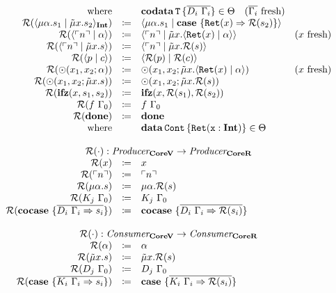 \[\begin{array}{rcll}
    \text{where} &  & \codata{T}{\overline{D_i\ \Gamma_i}} \in \Theta \quad \fresh{\overline{\Gamma_i}} & \\
    \redundancy{\cut{\mu\alpha.s_1}{\tilde{\mu}x.s_2}_\tyint} & \coloneq & \cut{\mu\alpha.s_1}{\case{\mathtt{Ret}(x) \Rightarrow \redundancy{s_2}}} & \\
    \redundancy{\cut{\lit{n}}{\alpha}} & \coloneq & \cut{\lit{n}}{\tilde{\mu}x.\cut{\mathtt{Ret}(x)}{\alpha}} & \fresh{x} \\
    \redundancy{\cut{\lit{n}}{\tilde{\mu}x.s}} & \coloneq & \cut{\lit{n}}{\tilde{\mu}x.\redundancy{s}} & \\
    \redundancy{\cut{p}{c}} & \coloneq & \cut{\redundancy{p}}{\redundancy{c}} & \\
    \redundancy{\odot(x_1, x_2; \alpha)}{} & \coloneq & \odot(x_1, x_2; \tilde{\mu}x.\cut{\mathtt{Ret}(x)}{\alpha}) & \fresh{x} \\
    \redundancy{\odot(x_1, x_2; \tilde{\mu}x.s)}{} & \coloneq & \odot(x_1, x_2; \tilde{\mu}x.\redundancy{s}) & \\
    \redundancy{\ifz{x}{s_1}{s_2}}{} & \coloneq & \ifz{x}{\redundancy{s_1}}{\redundancy{s_2}} & \\
    \redundancy{f\ \Gamma_0}{} & \coloneq & f\ \Gamma_0 & \\
    \redundancy{\done}{} & \coloneq & \done & \\
    \text{where} & & \data{Cont}{\mathtt{Ret(x : \tyint)}} \in \Theta & \\
    \\
    \multicolumn{4}{c}{\redundancy{\cdot} : \emph{Producer}_{\targetvar{}} \rightarrow \emph{Producer}_{\targetred{}}}\\
    \redundancy{x} & \coloneq & x & \\
    \redundancy{\lit{n}} & \coloneq & \lit{n} & \\
    \redundancy{\mu\alpha.s} & \coloneq & \mu\alpha.\redundancy{s} & \\
    \redundancy{K_j\ \Gamma_0} & \coloneq & K_j\ \Gamma_0 & \\
    \redundancy{\cocase{\overline{D_i\ \Gamma_i \Rightarrow s_i}}} & \coloneq & \cocase{\overline{D_i\ \Gamma_i \Rightarrow \redundancy{s_i}}} & \\
    \\
    \multicolumn{4}{c}{\redundancy{\cdot} : \emph{Consumer}_{\targetvar{}} \rightarrow \emph{Consumer}_{\targetred{}}}\\
    \redundancy{\alpha} & \coloneq & \alpha & \\
    \redundancy{\tilde{\mu}x.s} & \coloneq & \tilde{\mu}x.\redundancy{s} & \\
    \redundancy{D_j\ \Gamma_0} & \coloneq & D_j\ \Gamma_0 & \\
    \redundancy{\case{\overline{K_i\ \Gamma_i \Rightarrow s_i}}} & \coloneq & \case{\overline{K_i\ \Gamma_i \Rightarrow \redundancy{s_i}}} & \\
  \end{array}
\]
